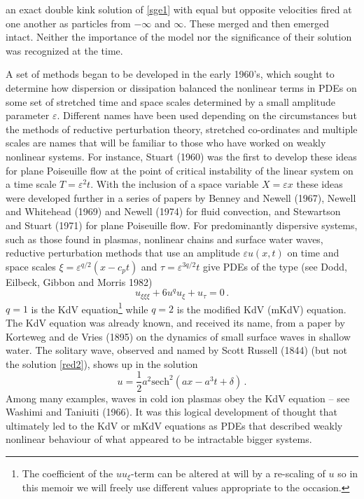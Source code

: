\documentclass[11pt]{article}
\newcommand{\bel}{\begin{equation}\label}
\newcommand{\ee}{\end{equation}}
\newcommand{\shalf}{{\ensuremath{\scriptstyle\frac{1}{2}}}}
\begin{document}
an exact double kink solution of \eqref{sge1} with equal but opposite velocities fired at one another as particles from 
$-\infty$ and $\infty$. These merged and then emerged intact. Neither the importance of the model nor the significance 
of their solution was recognized at the time. 
\par\smallskip%
A set of methods began to be developed in the early 1960's, which sought to determine how dispersion or dissipation 
balanced the nonlinear terms in PDEs on some set of stretched time and space scales determined by a small amplitude 
parameter $\varepsilon$. Different names have been used depending on the circumstances but the methods of reductive 
perturbation theory, stretched co-ordinates and multiple scales are names that will be familiar to those who have 
worked on weakly nonlinear systems. For instance, Stuart (1960) was the first to develop these ideas for plane 
Poiseuille flow at the point of critical instability of the linear system on a time scale $T=\varepsilon^{2}t$. With 
the inclusion of a space variable $X=\varepsilon x$ these ideas were developed further in a series of papers by Benney 
and Newell (1967), Newell and Whitehead (1969) and Newell (1974) for fluid convection, and Stewartson and Stuart (1971) 
for plane Poiseuille flow. For predominantly dispersive systems, such as those found in plasmas, nonlinear chains and 
surface water waves, reductive perturbation methods that use an amplitude $\varepsilon u(x,t)$ on time and space scales 
$\xi = \varepsilon^{q/2}(x-c_{p}t)$ and $\tau = \varepsilon^{3q/2}t$ give PDEs of the type (see Dodd, Eilbeck, Gibbon 
and Morris 1982)
\bel{red1}
u_{\xi\xi\xi} + 6u^{q}u_{\xi} + u_{\tau} = 0\,.
\ee
$q=1$ is the KdV equation\footnote{The coefficient of the $uu_{\xi}$-term can be altered at will by a re-scaling of $u$ 
so in this memoir we will freely use different values appropriate to the occasion.} while $q=2$ is the modified KdV (mKdV) equation. The KdV equation was already known, and received its name, from a paper by Korteweg and de Vries (1895) on the dynamics of small surface waves in shallow water. The solitary wave, observed and named by Scott Russell (1844) (but not 
the solution \eqref{red2}), shows up in the solution 
\bel{red2}
u = \shalf a^{2}\mbox{sech}^{2}(ax-a^{3}t + \delta)\,.
\ee
Among many examples, waves in cold ion plasmas obey the KdV equation -- see Washimi and Taniuiti (1966). It was this logical development of thought that ultimately led to the KdV or mKdV equations as PDEs that described weakly nonlinear behaviour of what appeared to be intractable bigger systems. 
\end{document}
